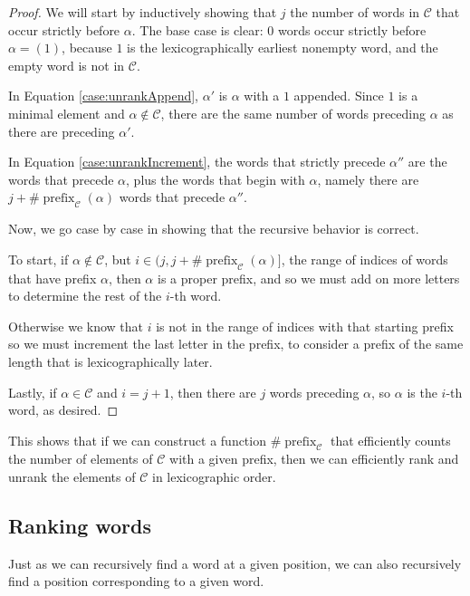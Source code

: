 \begin{proof}
  We will start by inductively showing that $j$ the number of words in
  $\mathcal{C}$ that occur strictly before $\alpha$.
  The base case is clear: $0$ words occur strictly before $\alpha = (1)$,
  because $1$ is the lexicographically earliest nonempty word, and the empty
  word is not in $\mathcal{C}$.

  In Equation \ref{case:unrankAppend}, $\alpha'$ is $\alpha$ with a $1$
  appended. Since $1$ is a minimal element and $\alpha \not\in \mathcal{C}$,
  there are the same number of words preceding $\alpha$ as there are preceding
  $\alpha'$.

  In Equation \ref{case:unrankIncrement}, the words that strictly precede
  $\alpha''$ are the words that precede $\alpha$, plus the words that begin
  with $\alpha$, namely there are
  $j + \#\operatorname{prefix}_\mathcal{C}(\alpha)$ words that precede
  $\alpha''$.

  Now, we go case by case in showing that the recursive behavior is correct.

  To start, if $\alpha \not\in \mathcal{C}$, but
  $i \in (j, j + \#\operatorname{prefix}_\mathcal{C}(\alpha)]$,
  the range of indices of words that have prefix $\alpha$, then $\alpha$
  is a proper prefix, and so we must add on more letters to determine
  the rest of the $i$-th word.

  Otherwise we know that $i$ is not in the range of indices with that starting
  prefix so we must increment the last letter in the prefix, to consider a
  prefix of the same length that is lexicographically later.

  Lastly, if $\alpha \in \mathcal{C}$ and $i = j + 1$, then there are
  $j$ words preceding $\alpha$, so $\alpha$ is the $i$-th word, as desired.
\end{proof}

This shows that if we can construct a function
$\#\operatorname{prefix}_\mathcal{C}$ that efficiently counts the number of
elements of $\mathcal{C}$ with a given prefix, then we can efficiently rank and
unrank the elements of $\mathcal{C}$ in lexicographic order.

\subsection{Ranking words}
Just as we can recursively find a word at a given position, we can also
recursively find  a position corresponding to a given word.

